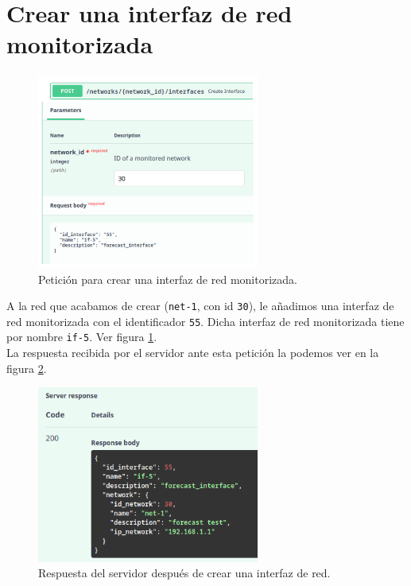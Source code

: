 \documentclass[a4paper, oneside, 12pt]{book}
\begin{document}
	\section{Crear una interfaz de red monitorizada}
	
	\begin{figure}[h!]
		\begin{center}
			\includegraphics[width=0.65\textwidth]{diag/request_create_if.png}
			\caption{Petición para crear una interfaz de red monitorizada.}
			\label{img: request create if (validate)}
		\end{center}
	\end{figure}

	\pagebreak
	
	\noindent A la red que acabamos de crear (\texttt{net-1}, con id \texttt{30}), le añadimos una interfaz de red monitorizada con el identificador \texttt{55}. Dicha interfaz de red monitorizada tiene por nombre \texttt{if-5}. Ver figura \ref{img: request create if (validate)}. \\
	
	\noindent La respuesta recibida por el servidor ante esta petición la podemos ver en la figura \ref{img: response create if (validate)}.
	
	\begin{figure}[h!]
		\begin{center}
			\includegraphics[width=0.65\textwidth]{img/response_create_if.png}
			\caption{Respuesta del servidor después de crear una interfaz de red.}
			\label{img: response create if (validate)}
		\end{center}
	\end{figure}
	
\end{document}
